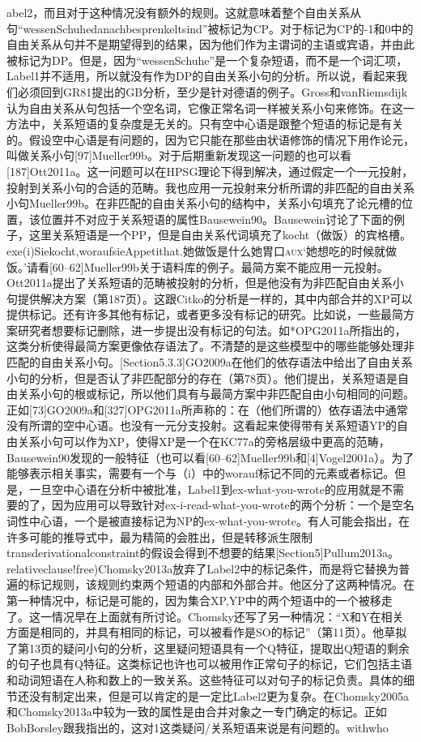 abel2，而且对于这种情况没有额外的规则。这就意味着整个自由关系从句“wessenSchuhedanachbesprenkeltsind”被标记为CP。对于标记为CP的-1和0中的自由关系从句并不是期望得到的结果，因为他们作为主谓词的主语或宾语，并由此被标记为DP。但是，因为“wessenSchuhe”是一个复杂短语，而不是一个词汇项，Label1并不适用，所以就没有作为DP的自由关系小句的分析。所以说，看起来我们必须回到GR81提出的GB分析，至少是针对德语的例子。Gross和vanRiemsdijk认为自由关系从句包括一个空名词，它像正常名词一样被关系小句来修饰。在这一方法中，关系短语的复杂度是无关的。只有空中心语是跟整个短语的标记是有关的。假设空中心语是有问题的，因为它只能在那些由状语修饰的情况下用作论元，叫做关系小句[97]Mueller99b。对于后期重新发现这一问题的也可以看[187]Ott2011a。这一问题可以在HPSG理论下得到解决，通过假定一个一元投射，投射到关系小句的合适的范畴。我也应用一元投射来分析所谓的非匹配的自由关系小句Mueller99b。在非匹配的自由关系小句的结构中，关系小句填充了论元槽的位置，该位置并不对应于关系短语的属性Bausewein90。Bausewein讨论了下面的例子，这里关系短语是一个PP，但是自由关系代词填充了kocht（做饭）的宾格槽。exe(i)Siekocht,woraufsieAppetithat.她做饭是什么她胃口\textsc{aux}`她想吃的时候就做饭。'请看[60--62]Mueller99b关于语料库的例子。最简方案不能应用一元投射。Ott2011a提出了关系短语的范畴被投射的分析，但是他没有为非匹配自由关系小句提供解决方案（第187页）。这跟Citko的分析是一样的，其中内部合并的XP可以提供标记。还有许多其他有标记，或者更多没有标记的研究。比如说，一些最简方案研究者想要标记删除，进一步提出没有标记的句法。如*OPG2011a所指出的，这类分析使得最简方案更像依存语法了。不清楚的是这些模型中的哪些能够处理非匹配的自由关系小句。[Section5.3.3]GO2009a在他们的依存语法中给出了自由关系小句的分析，但是否认了非匹配部分的存在（第78页）。他们提出，关系短语是自由关系小句的根或标记，所以他们具有与最简方案中非匹配自由小句相同的问题。正如[73]GO2009a和[327]OPG2011a所声称的：在（他们所谓的）依存语法中通常没有所谓的空中心语。也没有一元分支投射。这看起来使得带有关系短语YP的自由关系小句可以作为XP，使得XP是一个在KC77a的旁格层级中更高的范畴，Bausewein90发现的一般特征（也可以看[60--62]Mueller99b和[4]Vogel2001a）。为了能够表示相关事实，需要有一个与（i）中的worauf标记不同的元素或者标记。但是，一旦空中心语在分析中被批准，Label1到ex-what-you-wrote的应用就是不需要的了，因为应用可以导致针对ex-i-read-what-you-wrote的两个分析：一个是空名词性中心语，一个是被直接标记为NP的ex-what-you-wrote。有人可能会指出，在许多可能的推导式中，最为精简的会胜出，但是转移派生限制transderivationalconstraint的假设会得到不想要的结果[Section5]Pullum2013a。relativeclause!free)Chomsky2013a放弃了Label2中的标记条件，而是将它替换为普遍的标记规则，该规则约束两个短语的内部和外部合并。他区分了这两种情况。在第一种情况中，标记是可能的，因为集合XP,YP中的两个短语中的一个被移走了。这一情况早在上面就有所讨论。Chomsky还写了另一种情况：“X和Y在相关方面是相同的，并具有相同的标记，可以被看作是SO的标记”（第11页）。他草拟了第13页的疑问小句的分析，这里疑问短语具有一个Q特征，提取出Q短语的剩余的句子也具有Q特征。这类标记也许也可以被用作正常句子的标记，它们包括主语和动词短语在人称和数上的一致关系。这些特征可以对句子的标记负责。具体的细节还没有制定出来，但是可以肯定的是一定比Label2更为复杂。在Chomsky2005a和Chomsky2013a中较为一致的属性是由合并对象之一专门确定的标记。正如BobBorsley跟我指出的，这对1这类疑问/关系短语来说是有问题的。withwho